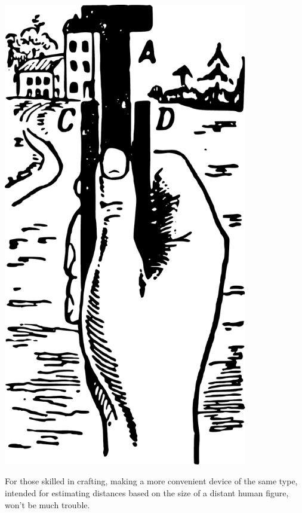 \begin{marginfigure}%
\centering
\includegraphics[width=0.8\textwidth]{figures/ch-02/fig-039.pdf}
\end{marginfigure}

For those skilled in crafting, making a more convenient device of the same type, intended for estimating distances based on the size of a distant human figure, won't be much trouble.

